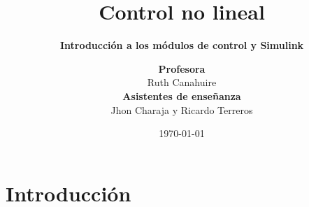 

\title[Laboratorio 0]{Control no lineal}
\subtitle{\textbf{Introducción a los módulos de control y Simulink}}

\author[J. Charaja and R. Terreros (UTEC)]{\textbf {Profesora} \\ Ruth Canahuire \\ \vspace{1em} \textbf{Asistentes de enseñanza} \\ Jhon Charaja y Ricardo Terreros}


\date{\today}



\frame{\titlepage}





\section{Introducción}

